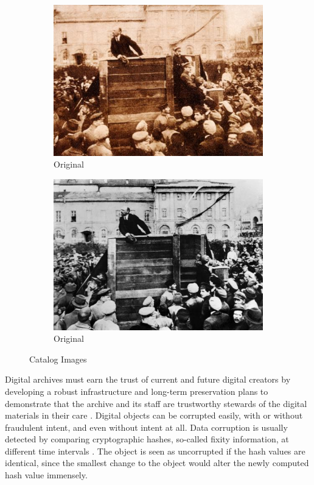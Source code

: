 \begin{figure}[h]%
    \centering
    \begin{subfigure}{6cm}
    \includegraphics[width=\linewidth]{graphics/trotzki1.jpg}
    \caption{Original}\label{fig:f1}
    \end{subfigure}
    \qquad
    \begin{subfigure}{6cm}
    \includegraphics[width=\linewidth]{graphics/trotzki2.jpg}
    \caption{Original}
    \end{subfigure}
    \caption{Catalog Images}\label{fig:f2}
\end{figure}

Digital archives must earn the trust of current and future digital creators by developing a robust infrastructure and long-term preservation plans to demonstrate that the archive and its staff are trustworthy stewards of the digital materials in their care \cite[37]{kirschenbaum2010digital}. Digital objects can be corrupted easily, with or without fraudulent intent, and even without intent at all. Data corruption is usually detected by comparing cryptographic hashes, so-called fixity information, at different time intervals \cite[1]{de2014checking}. The object is seen as uncorrupted if the hash values are identical, since the smallest change to the object would alter the newly computed hash value immensely. 

